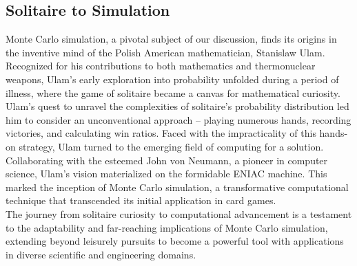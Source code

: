 \documentclass[12pt]{article}
\begin{document}
    \subsection{Solitaire to Simulation}
    Monte Carlo simulation, a pivotal subject of our discussion, finds its origins in the inventive mind of the Polish American mathematician, Stanislaw Ulam. Recognized for his contributions to both mathematics and thermonuclear weapons, Ulam's early exploration into probability unfolded during a period of illness, where the game of solitaire became a canvas for mathematical curiosity.\\
    Ulam's quest to unravel the complexities of solitaire's probability distribution led him to consider an unconventional approach – playing numerous hands, recording victories, and calculating win ratios. Faced with the impracticality of this hands-on strategy, Ulam turned to the emerging field of computing for a solution.\\
    Collaborating with the esteemed John von Neumann, a pioneer in computer science, Ulam's vision materialized on the formidable ENIAC machine. This marked the inception of Monte Carlo simulation, a transformative computational technique that transcended its initial application in card games.\\
    The journey from solitaire curiosity to computational advancement is a testament to the adaptability and far-reaching implications of Monte Carlo simulation, extending beyond leisurely pursuits to become a powerful tool with applications in diverse scientific and engineering domains.
\end{document}

